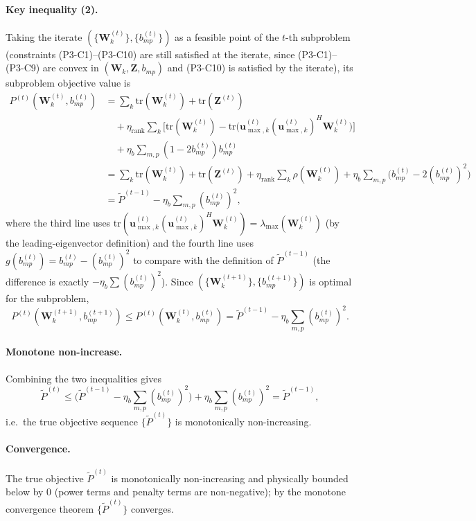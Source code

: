 \documentclass[12pt,a4paper]{article}
\newcommand{\vect}[1]{\mathbf{#1}}
\newcommand{\mat}[1]{\mathbf{#1}}
\newcommand{\tr}{\text{tr}}
\begin{document}
\paragraph{Key inequality (2).} Taking the iterate $(\{\mat{W}_k^{(t)}\}, \{b_{mp}^{(t)}\})$ as a feasible point of the $t$-th subproblem (constraints (P3-C1)--(P3-C10) are still satisfied at the iterate, since (P3-C1)--(P3-C9) are convex in $(\mat{W}_k, \mat{Z}, b_{mp})$ and (P3-C10) is satisfied by the iterate), its subproblem objective value is
\begin{align*}
P^{(t)}(\mat{W}_k^{(t)}, b_{mp}^{(t)}) 
&= \sum_k \tr(\mat{W}_k^{(t)}) + \tr(\mat{Z}^{(t)}) \\
&\quad + \eta_{\text{rank}} \sum_k \Big[\tr(\mat{W}_k^{(t)}) - \tr\big(\vect{u}_{\max,k}^{(t)} (\vect{u}_{\max,k}^{(t)})^H \mat{W}_k^{(t)}\big)\Big] \\
&\quad + \eta_b \sum_{m,p} (1 - 2b_{mp}^{(t)}) b_{mp}^{(t)} \\
&= \sum_k \tr(\mat{W}_k^{(t)}) + \tr(\mat{Z}^{(t)}) + \eta_{\text{rank}} \sum_k \rho(\mat{W}_k^{(t)}) + \eta_b \sum_{m,p} \big(b_{mp}^{(t)} - 2(b_{mp}^{(t)})^2\big) \\
&= \tilde{P}^{(t-1)} - \eta_b \sum_{m,p} (b_{mp}^{(t)})^2,
\end{align*}
where the third line uses $\tr(\vect{u}_{\max,k}^{(t)} (\vect{u}_{\max,k}^{(t)})^H \mat{W}_k^{(t)}) = \lambda_{\max}(\mat{W}_k^{(t)})$ (by the leading-eigenvector definition) and the fourth line uses $g(b_{mp}^{(t)}) = b_{mp}^{(t)} - (b_{mp}^{(t)})^2$ to compare with the definition of $\tilde{P}^{(t-1)}$ (the difference is exactly $-\eta_b \sum (b_{mp}^{(t)})^2$). Since $(\{\mat{W}_k^{(t+1)}\}, \{b_{mp}^{(t+1)}\})$ is optimal for the subproblem,
\[
P^{(t)}(\mat{W}_k^{(t+1)}, b_{mp}^{(t+1)}) \leq P^{(t)}(\mat{W}_k^{(t)}, b_{mp}^{(t)}) = \tilde{P}^{(t-1)} - \eta_b \sum_{m,p} (b_{mp}^{(t)})^2.
\]

\paragraph{Monotone non-increase.} Combining the two inequalities gives
\[
\tilde{P}^{(t)} \leq \big(\tilde{P}^{(t-1)} - \eta_b \sum_{m,p} (b_{mp}^{(t)})^2\big) + \eta_b \sum_{m,p} (b_{mp}^{(t)})^2 = \tilde{P}^{(t-1)},
\]
i.e.\ the true objective sequence $\{\tilde{P}^{(t)}\}$ is monotonically non-increasing.

\paragraph{Convergence.} The true objective $\tilde{P}^{(t)}$ is monotonically non-increasing and physically bounded below by $0$ (power terms and penalty terms are non-negative); by the monotone convergence theorem $\{\tilde{P}^{(t)}\}$ converges.
\end{document}
